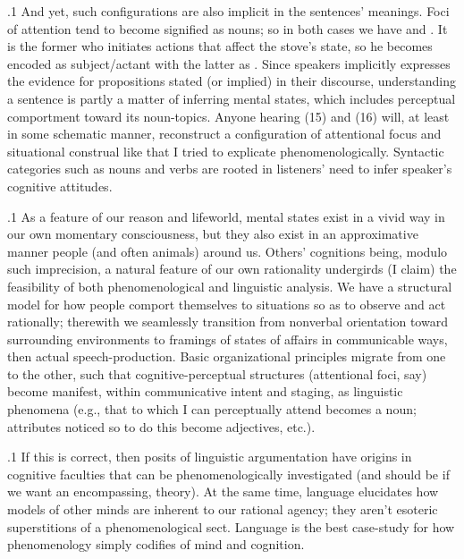 \documentclass[11pt, twocolumn]{article}
\begin{document}
\p.1{%
\:\+And yet, such configurations are also implicit in the
sentences' meanings. \> Foci of attention tend to become
signified as nouns; so in both cases we have  and
. \> It is the former who initiates actions that
affect the stove's state, so he becomes encoded
as subject/actant with the latter as . \> Since speakers
implicitly expresses the evidence for propositions
stated (or implied) in their discourse, understanding a
sentence is partly a matter of inferring mental states,
which includes perceptual comportment toward
its noun-topics. \> Anyone hearing \exsRef(15) and \exsRef(16) will,
at least in some schematic manner, reconstruct a
configuration of attentional focus and situational
construal like that I tried to explicate 
phenomenologically. \> Syntactic categories such as nouns and verbs are
rooted in listeners' need to infer speaker's cognitive 
attitudes.\<\;
} %

\p.1{%
\:\+As a feature of our
reason and lifeworld, mental states exist
in a vivid way in our own momentary consciousness,
but they also exist in an approximative manner
\visavis{} people (and often animals) around 
us. \> Others' cognitions being, modulo such imprecision,
a natural feature of our own rationality undergirds
(I claim) the feasibility of both
phenomenological and linguistic 
analysis. \> We have a
structural model for how people comport themselves
to situations so as to observe and act rationally;
therewith we seamlessly transition
from nonverbal orientation toward surrounding
environments to framings of states of affairs
in communicable ways, then actual 
speech-production. \> Basic organizational principles migrate from one to
the other, such that cognitive-perceptual structures
(attentional foci, \pgl{}say) become manifest,
within communicative intent and staging, as
linguistic phenomena (e.g., that to which
I can perceptually attend becomes a noun; attributes
noticed so to do this become adjectives, etc.).\<\;
} %

\p.1{%
\:\+If this is correct, then posits of linguistic argumentation
have origins in cognitive faculties that can be
phenomenologically investigated (and should be if we
want an encompassing,  theory). \> At the
same time, language elucidates
how models of other minds are inherent to our
rational agency; they aren't esoteric superstitions
of a phenomenological sect. \> Language is the
best case-study for how phenomenology simply
codifies  of 
mind and cognition.\<\;
} %
\end{document}
